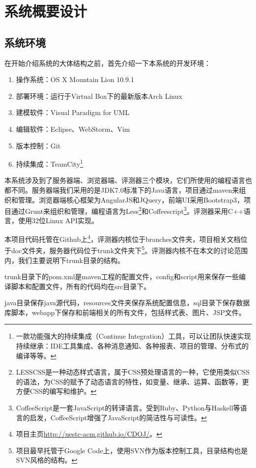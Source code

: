 
\chapter{系统概要设计}
\section{系统环境}
在开始介绍系统的大体结构之前，首先介绍一下本系统的开发环境：
\begin{enumerate}
	\item 操作系统：OS X Mountain Lion 10.9.1
	\item 部署环境：运行于Virtual Box下的最新版本Arch Linux
	\item 建模软件：Visual Paradigm for UML
	\item 编辑软件：Eclipse、WebStorm、Vim
	\item 版本控制：Git
	\item 持续集成：TeamCity\footnote{一款功能强大的持续集成（Continue Integration）工具，可以让团队快速实现持续继承：IDE工具集成、各种消息通知、各种报表、项目的管理、分布式的编译等等。}
\end{enumerate}

本系统涉及到了服务器端、浏览器端、评测器三个模块，它们所使用的编程语言也都不同。服务器端我们采用的是JDK7.0标准下的Java语言，项目通过maven来组织和管理。浏览器端核心框架为AngularJS和JQuery，前端UI采用Bootstrap3，项目通过Grunt来组织和管理，编程语言为Less\footnote{LESSCSS是一种动态样式语言，属于CSS预处理语言的一种，它使用类似CSS的语法，为CSS的赋予了动态语言的特性，如变量、继承、运算、函数等，更方便CSS的编写和维护。}和Coffeescript\footnote{CoffeeScript是一套JavaScript的转译语言。受到Ruby、Python与Haskell等语言的启发，CoffeeScript增强了JavaScript的简洁性与可读性。}。评测器采用C++语言，使用32位Linux API实现。

本项目代码托管在Github上\footnote{项目主页\url{http://uestc-acm.github.io/CDOJ/}。}，评测器内核位于branches文件夹，项目相关文档位于doc文件夹，服务器代码位于trunk文件夹下\footnote{项目最早托管于Google Code上，使用SVN作为版本控制工具，目录结构也是SVN风格的结构。}。评测器内核不在本文的讨论范围内，我们主要说明下trunk目录的结构。

trunk目录下的pom.xml是maven工程的配置文件，config和script用来保存一些编译脚本和配置文件，所有的代码均在src目录下。


java目录保存java源代码，resources文件夹保存系统配置信息，sql目录下保存数据库脚本，webapp下保存和前端相关的所有文件，包括样式表、图片、JSP文件。

